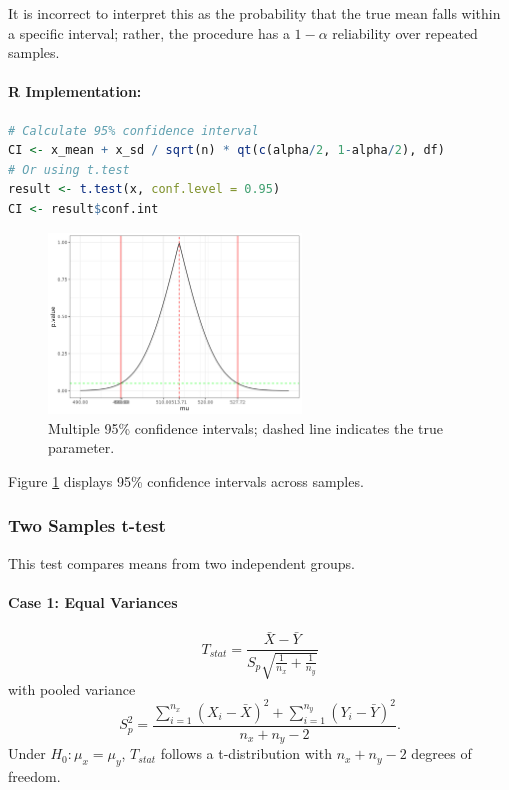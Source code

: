 \documentclass[11pt,a4paper]{article}
\begin{document}
\begin{warningbox}
It is incorrect to interpret this as the probability that the true mean falls within a specific interval; rather, the procedure has a $1-\alpha$ reliability over repeated samples.
\end{warningbox}

\paragraph{R Implementation:}
\begin{lstlisting}[language=R]
# Calculate 95% confidence interval
CI <- x_mean + x_sd / sqrt(n) * qt(c(alpha/2, 1-alpha/2), df)
# Or using t.test
result <- t.test(x, conf.level = 0.95)
CI <- result$conf.int
\end{lstlisting}

\begin{figure}[htb]
    \centering
    \includegraphics[width=0.6\textwidth]{confidence-intervals.png}
    \caption{Multiple 95\% confidence intervals; dashed line indicates the true parameter.}
    \label{fig:confidence-intervals}
\end{figure}

Figure \ref{fig:confidence-intervals} displays 95\% confidence intervals across samples.

\subsubsection{Two Samples t-test}

This test compares means from two independent groups.

\paragraph{Case 1: Equal Variances}
\begin{equation}
T_{stat} = \frac{\bar{X} - \bar{Y}}{S_p\sqrt{\frac{1}{n_x}+\frac{1}{n_y}}}
\end{equation}
with pooled variance
\[
S_p^2 = \frac{\sum_{i=1}^{n_x} (X_i-\bar{X})^2 + \sum_{i=1}^{n_y} (Y_i-\bar{Y})^2}{n_x+n_y-2}.
\]
Under $H_0: \mu_x = \mu_y$, $T_{stat}$ follows a t-distribution with $n_x+n_y-2$ degrees of freedom.
\end{document}
